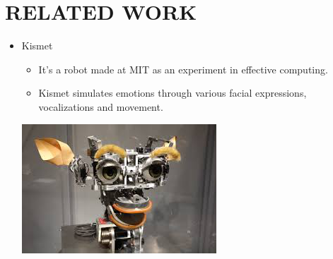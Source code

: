 \documentclass{fisatproject}
\begin{document}
\chapter{RELATED WORK}
\begin{itemize}
\item Kismet

    \begin{itemize}
    \item It’s a robot made at MIT as an experiment in effective
computing.
    \item Kismet simulates emotions through various facial expressions, vocalizations and movement.
    \end{itemize}
\begin{center}
\includegraphics{kismet.png}
\end{center}    

\end{itemize}
\end{document}
